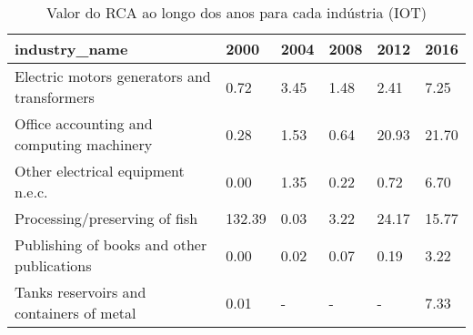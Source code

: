 \begin{table}
\centering
\caption{Valor do RCA ao longo dos anos para cada indústria (IOT)}
\begin{tabular}{p{6cm}p{1.5cm}p{1.5cm}p{1.5cm}p{1.5cm}p{1.5cm}}
\toprule
                              industry\_name &   2000 & 2004 & 2008 &  2012 &  2016 \\
\midrule
Electric motors generators and transformers &   0.72 & 3.45 & 1.48 &  2.41 &  7.25 \\
  Office accounting and computing machinery &   0.28 & 1.53 & 0.64 & 20.93 & 21.70 \\
          Other electrical equipment n.e.c. &   0.00 & 1.35 & 0.22 &  0.72 &  6.70 \\
              Processing/preserving of fish & 132.39 & 0.03 & 3.22 & 24.17 & 15.77 \\
 Publishing of books and other publications &   0.00 & 0.02 & 0.07 &  0.19 &  3.22 \\
   Tanks reservoirs and containers of metal &   0.01 &    - &    - &     - &  7.33 \\
\bottomrule
\end{tabular}
\end{table}
